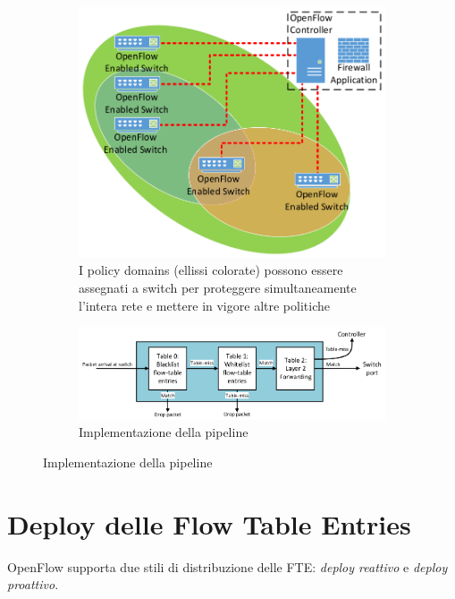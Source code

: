 \begin{figure}[H]
  \centering
  \begin{subfigure}[b]{0.46\linewidth}
    \includegraphics[width=\linewidth]{img/domains.png}
    \caption{I policy domains (ellissi colorate) possono essere assegnati a switch per proteggere simultaneamente l'intera rete e mettere in vigore altre politiche \cite{bakker2016network}}
    \label{fig:domains}
  \end{subfigure}
  \begin{subfigure}[b]{0.46\linewidth}
    \includegraphics[width=\linewidth]{img/pipeline.png}
    \caption{Implementazione della pipeline \cite{bakker2016network}}
    \label{fig:pipeline}
  \end{subfigure}
\end{figure}

\section{Deploy delle Flow Table Entries}

OpenFlow supporta due stili di distribuzione delle FTE: \textit{deploy reattivo} e \textit{deploy proattivo}.

